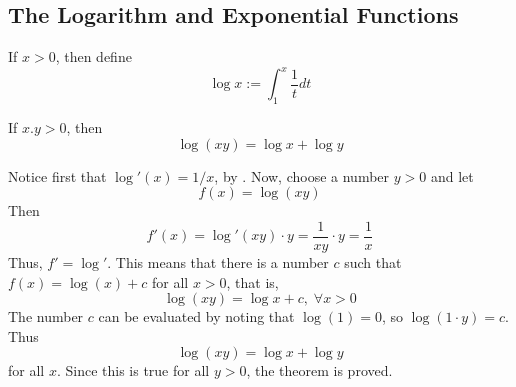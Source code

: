 \documentclass[12pt]{report}
\begin{document}
\begin{subappendices}
    \section{The Logarithm and Exponential Functions}
    
    \begin{defn}{}{}
        If $x > 0$, then define \begin{equation}
            \log x := \int_1^x\frac{1}{t}dt
        \end{equation}
    \end{defn}

    \begin{thm}{}{}
        If $x.y > 0$, then \begin{equation}
            \log(xy) = \log x+ \log y
        \end{equation}
    \end{thm}
    \begin{proof*}{}{}
        Notice first that $\log'(x) = 1/x$, by . Now, choose a number $y > 0$ and let \begin{equation*}
            f(x) = \log(xy)
        \end{equation*}
        Then\begin{equation*}
            f'(x) = \log'(xy)\cdot y = \frac{1}{xy}\cdot y = \frac{1}{x}
        \end{equation*}
        Thus, $f' = \log'$. This means that there is a number $c$ such that $f(x) = \log(x) + c$ for all $x > 0$, that is, \begin{equation*}
            \log(xy) = \log x+c,\;\forall x > 0
        \end{equation*}
        The number $c$ can be evaluated by noting that $\log(1) = 0$, so $\log(1\cdot y) = c$. Thus \begin{equation*}
            \log(xy) = \log x + \log y
        \end{equation*}
        for all $x$. Since this is true for all $y > 0$, the theorem is proved.
    \end{proof*}


\end{subappendices}
\end{document}

